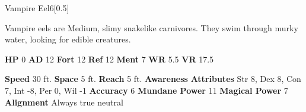   
  \begin{monsection}{Vampire Eel}{6}[0.5]
    \vspace{-1em}\vspace{-1em}
    \vspace{0em}

    
        Vampire eels are Medium, slimy snakelike carnivores.
        They swim through murky water, looking for edible creatures.
      

    \begin{spellcontent}
      \begin{spelltargetinginfo}
        \pari \textbf{HP} 0 \monsep
          \textbf{AD} 12 \monsep
          \textbf{Fort} 12 \monsep
          \textbf{Ref} 12 \monsep
          \textbf{Ment} 7
        \pari \textbf{WR} 5.5 \monsep
        \textbf{VR} 17.5
        
      \end{spelltargetinginfo}
    \end{spellcontent}
    \begin{monsterfooter}
      \pari \textbf{Speed} 30 ft. \monsep
        \textbf{Space} 5 ft. \monsep
        \textbf{Reach} 5 ft.
      \pari \textbf{Awareness} 
      \pari \textbf{Attributes}
        Str 8, Dex 8,
        Con 7, Int -8,
        Per 0, Wil -1
      \pari \textbf{Accuracy} 6 \monsep
        \textbf{Mundane Power} 11 \monsep
      \textbf{Magical Power} 7
      \pari \textbf{Alignment} Always true neutral
    \end{monsterfooter}
  \end{monsection}
  
